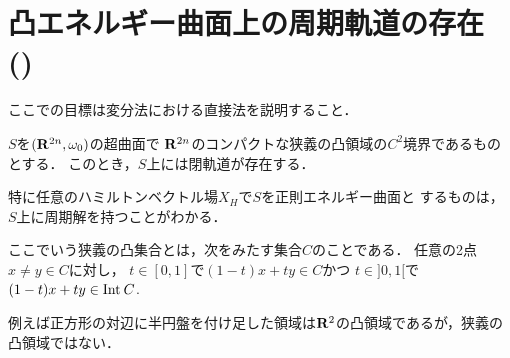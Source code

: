\section{凸エネルギー曲面上の周期軌道の存在 (\cite[\S1.5]{HZ94})}

ここでの目標は変分法における直接法を説明すること．
\begin{leftbar}
\begin{THM}[{\cite[Thm 5]{HZ94}}]
    \(S\)を\((\rr^{2n},\omega_0)\)の超曲面で
    \(\rr^{2n}\)のコンパクトな狭義の凸領域の\(C^2\)境界であるものとする．
    このとき，\(S\)上には閉軌道が存在する．
\end{THM}
\end{leftbar}

特に任意のハミルトンベクトル場\(X_H\)で\(S\)を正則エネルギー曲面と
するものは，\(S\)上に周期解を持つことがわかる．
\begin{CMT}
    ここでいう狭義の凸集合とは，次をみたす集合\(C\)のことである．
    任意の2点\(x\ne y\in C\)に対し，
    \(t\in[0,1]\)で\((1-t)x+ty\in C\)かつ
    \(t\in{]0,1[}\)で\((1-t)x+ty\in\Int[]C\).

    例えば正方形の対辺に半円盤を付け足した領域は\(\rr^2\)の凸領域であるが，狭義の凸領域ではない．
\end{CMT}


